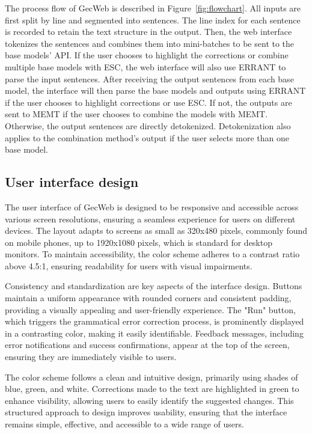 The process flow of GecWeb is described in Figure~\ref{fig:flowchart}.
All inputs are first split by line and segmented into sentences.
The line index for each sentence is recorded to retain the text structure in the output.
Then, the web interface tokenizes the sentences and combines them into mini-batches to be sent to the base models' API.
If the user chooses to highlight the corrections or combine multiple
base models with ESC, the web interface will also use ERRANT to parse the input sentences.
After receiving the output sentences from each base model, the interface will then parse the base models and outputs using ERRANT if the user chooses to highlight corrections or use ESC.
If not, the outputs are sent to MEMT if the user chooses to combine the models with MEMT.
Otherwise, the output sentences are directly detokenized.
Detokenization also applies to the combination method's output if the user selects more than one base model.

\subsection{User interface design}

The user interface of GecWeb is designed to be responsive and accessible across various screen resolutions, ensuring a seamless experience for users on different devices.
The layout adapts to screens as small as 320x480 pixels, commonly found on mobile phones, up to 1920x1080 pixels, which is standard for desktop monitors.
To maintain accessibility, the color scheme adheres to a contrast ratio above 4.5:1, ensuring readability for users with visual impairments.

Consistency and standardization are key aspects of the interface design.
Buttons maintain a uniform appearance with rounded corners and consistent padding, providing a visually appealing and user-friendly experience.
The "Run" button, which triggers the grammatical error correction process, is prominently displayed in a contrasting color, making it easily identifiable.
Feedback messages, including error notifications and success confirmations, appear at the top of the screen, ensuring they are immediately visible to users.

The color scheme follows a clean and intuitive design, primarily using shades of blue, green, and white.
Corrections made to the text are highlighted in green to enhance visibility, allowing users to easily identify the suggested changes.
This structured approach to design improves usability, ensuring that the interface remains simple, effective, and accessible to a wide range of users.

